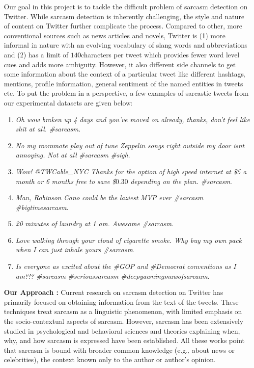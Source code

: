 Our goal in this project is to tackle the difficult problem of sarcasm detection on Twitter. While sarcasm detection
is inherently challenging, the style and nature of content on Twitter further complicate the process. Compared to other,
more conventional sources such as news articles and novels, Twitter is (1) more informal in nature with an evolving vocabulary of slang words and abbreviations and (2) has a limit of $140 $characters per tweet which provides fewer word level
cues and adds more ambiguity. However, it also different side channels to get some information about the context of a particular tweet like different hashtags, mentions, profile information, general sentiment of the named entities in tweets etc. To put the problem in a perspective, a few examples of sarcastic tweets from our experimental datasets are given below:
\begin{enumerate}
 \item \textit{Oh wow broken up 4 days and you've moved on already, thanks, don't feel like shit at all. \#sarcasm}.\\
 \item \textit{No my roommate play out of tune Zeppelin songs right outside my door isnt annoying. Not at all \#sarcasm \#sigh}.\\
 \item \textit{Wow! @TWCable\_NYC Thanks for the option of high speed internet at \$5 a month or 6 months free to save \$$0.30$ depending on the plan. \#sarcasm}.\\
 \item \textit{Man, Robinson Cano could be the laziest MVP ever \#sarcasm \#bigtimesarcasm}.\\
 \item \textit{20 minutes of laundry at 1 am. Awesome \#sarcasm}.\\
 \item \textit{Love walking through your cloud of cigarette smoke. Why buy my own pack when I can just inhale yours \#sarcasm}.\\
 \item \textit{Is everyone as excited about the \#GOP and \#Democrat conventions as I am?!? \#sarcasm \#serioussarcasm \#deepyawningmawofsarcaam}.\\
\end{enumerate}

\textbf{Our Approach :} Current research on sarcasm detection on Twitter \cite{riloff13,davidov10,tomas14,gonzalez_acl} has primarily focused on obtaining information from the text of the tweets. These techniques treat sarcasm as a linguistic phenomenon, with limited emphasis on the socio-contextual aspects of sarcasm. However, sarcasm has been extensively studied in psychological and behavioral sciences and theories explaining when, why, and how sarcasm is expressed have been established. All these works point that sarcasm is bound with broader common knowledge (e.g., about news or celebrities), the context known only to the author or author's opinion.\\

